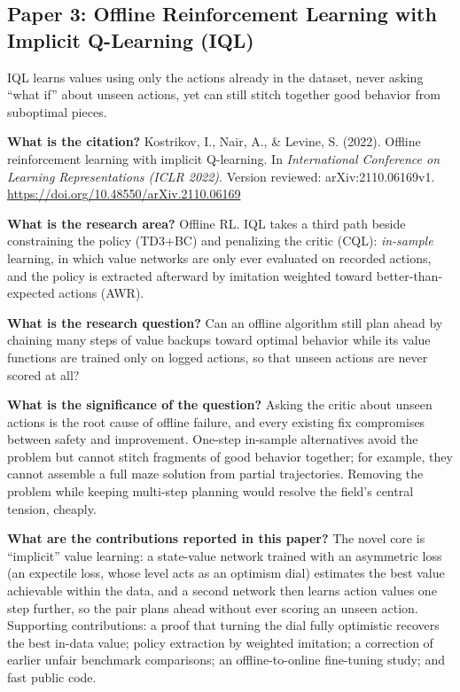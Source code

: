 \documentclass[11pt]{article}
\newcommand{\paper}[1]{\subsection*{#1}}
\newcommand{\q}[2]{\item \textbf{#1} #2}
\begin{document}
\paper{Paper 3: Offline Reinforcement Learning with Implicit Q-Learning (IQL)}
IQL learns values using only the actions already in the dataset, never asking ``what if'' about unseen actions, yet can still stitch together good behavior from suboptimal pieces.
\begin{qna}

\q{What is the citation?}
Kostrikov, I., Nair, A., \& Levine, S. (2022). Offline reinforcement learning with implicit Q-learning. In \emph{International Conference on Learning Representations (ICLR 2022)}. Version reviewed: arXiv:2110.06169v1. \url{https://doi.org/10.48550/arXiv.2110.06169}

\q{What is the research area?}
Offline RL. IQL takes a third path beside constraining the policy (TD3+BC) and penalizing the critic (CQL): \emph{in-sample} learning, in which value networks are only ever evaluated on recorded actions, and the policy is extracted afterward by imitation weighted toward better-than-expected actions (AWR).

\q{What is the research question?}
Can an offline algorithm still plan ahead by chaining many steps of value backups toward optimal behavior while its value functions are trained only on logged actions, so that unseen actions are never scored at all?

\q{What is the significance of the question?}
Asking the critic about unseen actions is the root cause of offline failure, and every existing fix compromises between safety and improvement. One-step in-sample alternatives avoid the problem but cannot stitch fragments of good behavior together; for example, they cannot assemble a full maze solution from partial trajectories. Removing the problem while keeping multi-step planning would resolve the field's central tension, cheaply.

\q{What are the contributions reported in this paper?}
The novel core is ``implicit'' value learning: a state-value network trained with an asymmetric loss (an expectile loss, whose level acts as an optimism dial) estimates the best value achievable within the data, and a second network then learns action values one step further, so the pair plans ahead without ever scoring an unseen action. Supporting contributions: a proof that turning the dial fully optimistic recovers the best in-data value; policy extraction by weighted imitation; a correction of earlier unfair benchmark comparisons; an offline-to-online fine-tuning study; and fast public code.


\end{qna}
\end{document}
